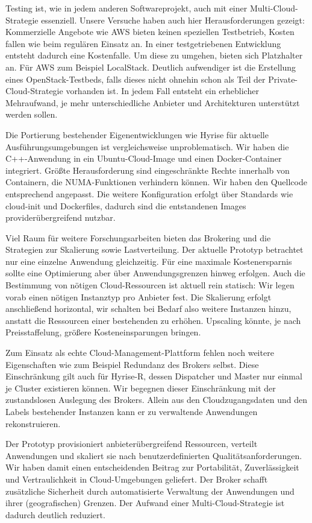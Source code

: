 Testing ist, wie in jedem anderen Softwareprojekt, auch mit einer Multi-Cloud-Strategie essenziell. Unsere Versuche haben auch hier Herausforderungen gezeigt: Kommerzielle Angebote wie AWS bieten keinen speziellen Testbetrieb, Kosten fallen wie beim regulären Einsatz an. In einer testgetriebenen Entwicklung entsteht dadurch eine Kostenfalle. Um diese zu umgehen, bieten sich Platzhalter an. Für AWS zum Beispiel LocalStack. Deutlich aufwendiger ist die Erstellung eines OpenStack-Testbeds, falls dieses nicht ohnehin schon als Teil der Private-Cloud-Strategie vorhanden ist. In jedem Fall entsteht ein erheblicher Mehraufwand, je mehr unterschiedliche Anbieter und Architekturen unterstützt werden sollen.

Die Portierung bestehender Eigenentwicklungen wie Hyrise für aktuelle Ausführungsumgebungen ist vergleichsweise unproblematisch. Wir haben die C++-Anwendung in ein Ubuntu-Cloud-Image und einen Docker-Container integriert. Größte Herausforderung sind eingeschränkte Rechte innerhalb von Containern, die NUMA-Funktionen verhindern können. Wir haben den Quellcode entsprechend angepasst. Die weitere Konfiguration erfolgt über Standards wie cloud-init und Dockerfiles, dadurch sind die entstandenen Images providerübergreifend nutzbar.

Viel Raum für weitere Forschungsarbeiten bieten das Brokering und die Strategien zur Skalierung sowie Lastverteilung. Der aktuelle Prototyp betrachtet nur eine einzelne Anwendung gleichzeitig. Für eine maximale Kostenersparnis sollte eine Optimierung aber über Anwendungsgrenzen hinweg erfolgen. Auch die Bestimmung von nötigen Cloud-Ressourcen ist aktuell rein statisch: Wir legen vorab einen nötigen Instanztyp pro Anbieter fest. Die Skalierung erfolgt anschließend horizontal, wir schalten bei Bedarf also weitere Instanzen hinzu, anstatt die Ressourcen einer bestehenden zu erhöhen. Upscaling könnte, je nach Preisstaffelung, größere Kosteneinsparungen bringen.

Zum Einsatz als echte Cloud-Management-Plattform fehlen noch weitere Eigenschaften wie zum Beispiel Redundanz des Brokers selbst. Diese Einschränkung gilt auch für Hyrise-R, dessen Dispatcher und Master nur einmal je Cluster existieren können. Wir begegnen dieser Einschränkung mit der zustandslosen Auslegung des Brokers. Allein aus den Cloudzugangsdaten und den Labels bestehender Instanzen kann er zu verwaltende Anwendungen rekonstruieren. 

Der Prototyp provisioniert anbieterübergreifend Ressourcen, verteilt Anwendungen und skaliert sie nach benutzerdefinierten Qualitätsanforderungen. Wir haben damit einen entscheidenden Beitrag zur Portabilität, Zuverlässigkeit und Vertraulichkeit in Cloud-Umgebungen geliefert. Der Broker schafft zusätzliche Sicherheit durch automatisierte Verwaltung der Anwendungen und ihrer (geografischen) Grenzen. Der Aufwand einer Multi-Cloud-Strategie ist dadurch deutlich reduziert.

